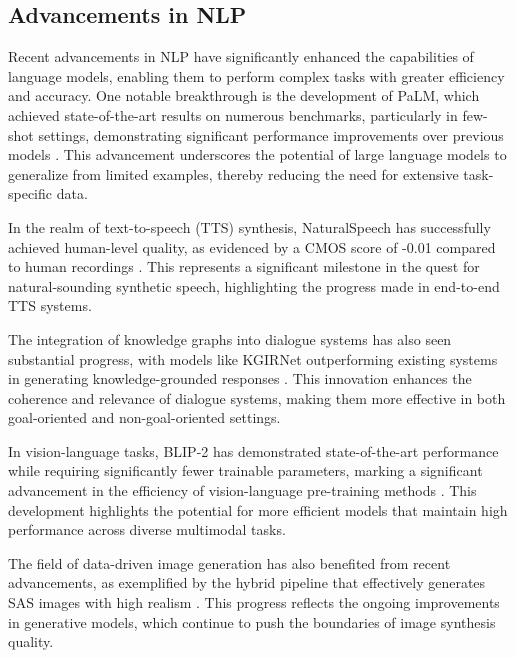 \subsection{Advancements in NLP} \label{subsec:Advancements in NLP}

Recent advancements in NLP have significantly enhanced the capabilities of language models, enabling them to perform complex tasks with greater efficiency and accuracy. One notable breakthrough is the development of PaLM, which achieved state-of-the-art results on numerous benchmarks, particularly in few-shot settings, demonstrating significant performance improvements over previous models \cite{chowdhery2023palm}. This advancement underscores the potential of large language models to generalize from limited examples, thereby reducing the need for extensive task-specific data.



In the realm of text-to-speech (TTS) synthesis, NaturalSpeech has successfully achieved human-level quality, as evidenced by a CMOS score of -0.01 compared to human recordings \cite{tan2022naturalspeechendtoendtextspeech}. This represents a significant milestone in the quest for natural-sounding synthetic speech, highlighting the progress made in end-to-end TTS systems.



The integration of knowledge graphs into dialogue systems has also seen substantial progress, with models like KGIRNet outperforming existing systems in generating knowledge-grounded responses \cite{chaudhuri2021groundingdialoguesystemsknowledge}. This innovation enhances the coherence and relevance of dialogue systems, making them more effective in both goal-oriented and non-goal-oriented settings.



In vision-language tasks, BLIP-2 has demonstrated state-of-the-art performance while requiring significantly fewer trainable parameters, marking a significant advancement in the efficiency of vision-language pre-training methods \cite{li2023blip}. This development highlights the potential for more efficient models that maintain high performance across diverse multimodal tasks.



The field of data-driven image generation has also benefited from recent advancements, as exemplified by the hybrid pipeline that effectively generates SAS images with high realism \cite{reed2019couplingrenderinggenerativeadversarial}. This progress reflects the ongoing improvements in generative models, which continue to push the boundaries of image synthesis quality.



